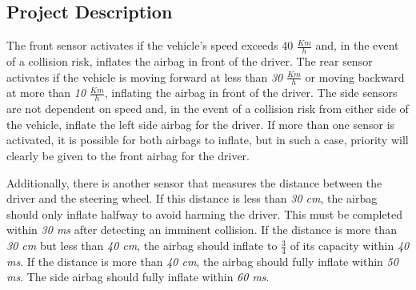 \documentclass[12pt	]{article}
\begin{document}
\subsection{Project Description}
The front sensor activates if the vehicle's speed exceeds 40 $\frac{Km}{h}$ and, in the event of a collision risk, inflates the airbag in front of the driver. The rear sensor activates if the vehicle is moving forward at less than \textit{30} $\frac{Km}{h}$ or moving backward at more than \textit{10} $\frac{Km}{h}$, inflating the airbag in front of the driver. The side sensors are not dependent on speed and, in the event of a collision risk from either side of the vehicle, inflate the left side airbag for the driver. If more than one sensor is activated, it is possible for both airbags to inflate, but in such a case, priority will clearly be given to the front airbag for the driver.

Additionally, there is another sensor that measures the distance between the driver and the steering wheel. If this distance is less than \textit{30 cm}, the airbag should only inflate halfway to avoid harming the driver. This must be completed within \textit{30 ms} after detecting an imminent collision. If the distance is more than \textit{30 cm} but less than \textit{40 cm}, the airbag should inflate to $\frac{3}{4}$ of its capacity within \textit{40 ms}. If the distance is more than \textit{40 cm}, the airbag should fully inflate within \textit{50 ms}. The side airbag should fully inflate within \textit{60 ms}.
\end{document}

